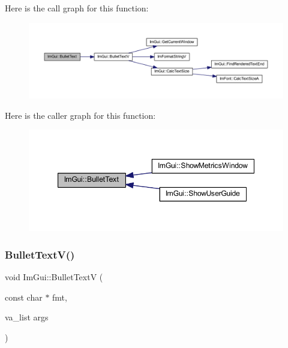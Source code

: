 Here is the call graph for this function\+:
\nopagebreak
\begin{figure}[H]
\begin{center}
\leavevmode
\includegraphics[width=350pt]{namespace_im_gui_af8d34d563b17c683943a0fa7bf5807bc_cgraph}
\end{center}
\end{figure}
Here is the caller graph for this function\+:
\nopagebreak
\begin{figure}[H]
\begin{center}
\leavevmode
\includegraphics[width=347pt]{namespace_im_gui_af8d34d563b17c683943a0fa7bf5807bc_icgraph}
\end{center}
\end{figure}
\mbox{\label{namespace_im_gui_af8f4b5e96c745e205974857f9a584583}} 
\subsubsection{\texorpdfstring{Bullet\+Text\+V()}{BulletTextV()}}
{\footnotesize\ttfamily void Im\+Gui\+::\+Bullet\+TextV (\begin{DoxyParamCaption}\item[{const char $\ast$}]{fmt,  }\item[{va\+\_\+list}]{args }\end{DoxyParamCaption})}

